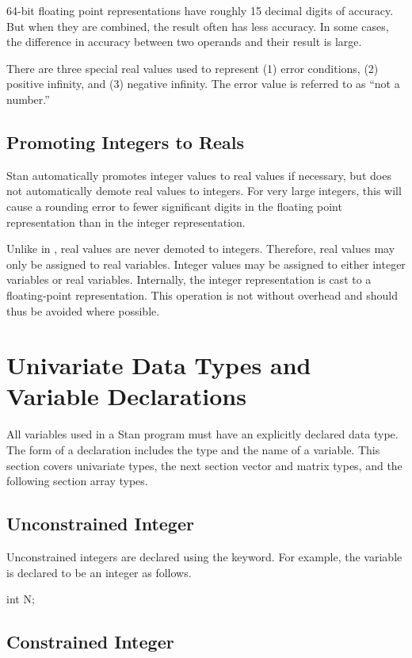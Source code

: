 64-bit floating point representations have roughly 15 decimal digits
of accuracy.  But when they are combined, the result often has less
accuracy.  In some cases, the difference in accuracy between two
operands and their result is large.

There are three special real values used to represent (1) error
conditions, (2) positive infinity, and (3) negative infinity.  The
error value is referred to as ``not a number.''

\subsection{Promoting Integers to Reals}

Stan automatically promotes integer values to real values if
necessary, but does not automatically demote real values to integers.
For very large integers, this will cause a rounding error to fewer
significant digits in the floating point representation than in the
integer representation.

Unlike in \Cpp, real values are never demoted to integers.  Therefore,
real values may only be assigned to real variables.  Integer values
may be assigned to either integer variables or real variables.
Internally, the integer representation is cast to a floating-point
representation.  This operation is not without overhead and should
thus be avoided where possible.


\section{Univariate Data Types and Variable Declarations}

All variables used in a Stan program must have an explicitly declared
data type.  The form of a declaration includes the type and the name
of a variable.  This section covers univariate types, the next section
vector and matrix types, and the following section array types.

\subsection{Unconstrained Integer}

Unconstrained integers are declared using the  keyword.
For example, the variable  is declared to be an integer as follows.
%
\begin{stancode}
int N;
\end{stancode}
%

\subsection{Constrained Integer}

